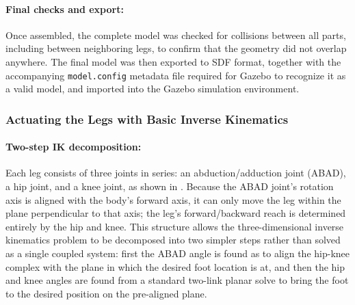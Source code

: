 \documentclass[12pt]{article}
\begin{document}
\paragraph{Final checks and export:} Once assembled, the complete model was checked for collisions between all parts, including between neighboring legs, to confirm that the geometry did not overlap anywhere. The final model was then exported to SDF format, together with the accompanying \texttt{model.config} metadata file required for Gazebo to recognize it as a valid model, and imported into the Gazebo simulation environment.

\subsubsection{Actuating the Legs with Basic Inverse Kinematics}
\label{sec:actuating-legs}
\paragraph{Two-step IK decomposition:} Each leg consists of three joints in series: an abduction/adduction joint (ABAD), a hip joint, and a knee joint, as shown in . Because the ABAD joint's rotation axis is aligned with the body's forward axis, it can only move the leg within the plane perpendicular to that axis; the leg's forward/backward reach is determined entirely by the hip and knee. This structure allows the three-dimensional inverse kinematics problem to be decomposed into two simpler steps rather than solved as a single coupled system: first the ABAD angle is found as to align the hip-knee complex with the plane in which the desired foot location is at, and then the hip and knee angles are found from a standard two-link planar solve to bring the foot to the desired position on the pre-aligned plane.
\end{document}
